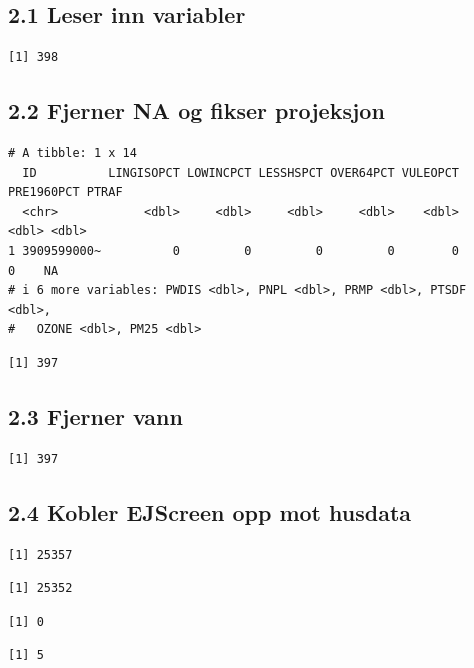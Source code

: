 \documentclass[
  norsk,
  a4paper,
]{article}
\begin{document}
\subsection{2.1 Leser inn variabler}\label{leser-inn-variabler}

\begin{verbatim}
[1] 398
\end{verbatim}

\subsection{2.2 Fjerner NA og fikser
projeksjon}\label{fjerner-na-og-fikser-projeksjon}

\begin{verbatim}
# A tibble: 1 x 14
  ID          LINGISOPCT LOWINCPCT LESSHSPCT OVER64PCT VULEOPCT PRE1960PCT PTRAF
  <chr>            <dbl>     <dbl>     <dbl>     <dbl>    <dbl>      <dbl> <dbl>
1 3909599000~          0         0         0         0        0          0    NA
# i 6 more variables: PWDIS <dbl>, PNPL <dbl>, PRMP <dbl>, PTSDF <dbl>,
#   OZONE <dbl>, PM25 <dbl>
\end{verbatim}

\begin{verbatim}
[1] 397
\end{verbatim}

\subsection{2.3 Fjerner vann}\label{fjerner-vann}

\begin{verbatim}
[1] 397
\end{verbatim}

\subsection{2.4 Kobler EJScreen opp mot
husdata}\label{kobler-ejscreen-opp-mot-husdata}

\begin{verbatim}
[1] 25357
\end{verbatim}

\begin{verbatim}
[1] 25352
\end{verbatim}

\begin{verbatim}
[1] 0
\end{verbatim}

\begin{verbatim}
[1] 5
\end{verbatim}
\end{document}
